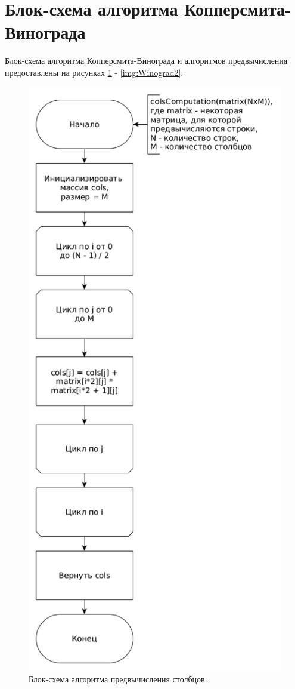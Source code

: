 \documentclass[12pt]{report}
\begin{document}
\section{Блок-схема алгоритма Копперсмита-Винограда}
Блок-схема алгоритма Копперсмита-Винограда и алгоритмов предвычисления предоставлены на рисунках \ref{img:cols} - \ref{img:Winograd2}.

\begin{figure}
\begin{center}
\includegraphics[scale=0.33]{inc/img/colsComp.png}
\captionsetup{justification=centering}
	\caption{Блок-схема алгоритма предвычисления столбцов.}
	\label{img:cols}	
\end{center}
\end{figure}
\end{document}
